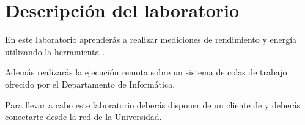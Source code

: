 \section{Descripción del laboratorio}

En este laboratorio aprenderás a realizar mediciones de rendimiento y energía
utilizando la herramienta .

Además realizarás la ejecución remota sobre un sistema de colas de trabajo 
ofrecido por el Departamento de Informática.

Para llevar a cabo este laboratorio deberás disponer de un cliente de 
y deberás conectarte desde la red de la Universidad.
